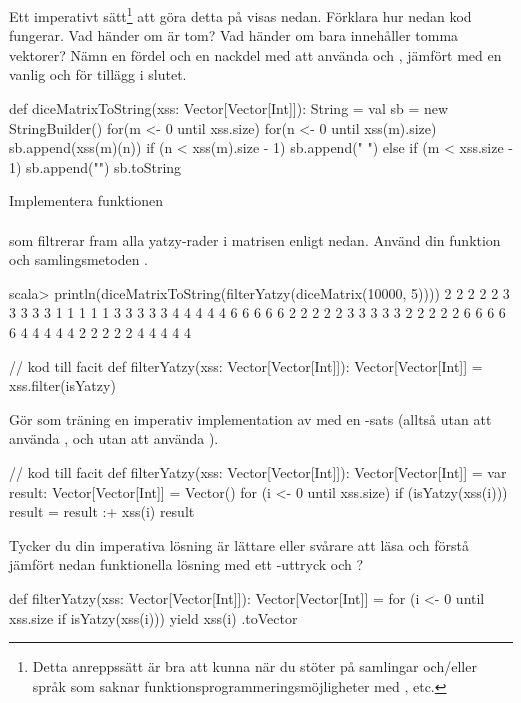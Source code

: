 \Subtask\Pen Ett imperativt sätt\footnote{Detta anreppssätt är bra att kunna när du stöter på samlingar och/eller språk som saknar funktionsprogrammeringsmöjligheter med ,  etc.} att göra detta på visas nedan. Förklara hur nedan kod fungerar. Vad händer om  är tom? Vad händer om  bara innehåller tomma vektorer? Nämn en fördel och en nackdel med att använda  och , jämfört med en vanlig  och \code{+} för tillägg i slutet.
\begin{Code}
def diceMatrixToString(xss: Vector[Vector[Int]]): String = {
  val sb = new StringBuilder()
  for(m <- 0 until xss.size) {
    for(n <- 0 until xss(m).size) { 
      sb.append(xss(m)(n))
      if (n < xss(m).size - 1) sb.append(" ") 
      else if (m < xss.size - 1) sb.append("\n")
    }
  }
  sb.toString
}
\end{Code}

\Subtask Implementera funktionen \\  \\ som filtrerar fram alla yatzy-rader i matrisen  enligt nedan. Använd din funktion  och samlingsmetoden . 
\begin{REPL}
scala> println(diceMatrixToString(filterYatzy(diceMatrix(10000, 5))))
2 2 2 2 2
3 3 3 3 3
1 1 1 1 1
3 3 3 3 3
4 4 4 4 4
6 6 6 6 6
2 2 2 2 2
3 3 3 3 3
2 2 2 2 2
6 6 6 6 6
4 4 4 4 4
2 2 2 2 2
4 4 4 4 4

\end{REPL}

\begin{Code}
// kod till facit
def filterYatzy(xss: Vector[Vector[Int]]): Vector[Vector[Int]] = 
  xss.filter(isYatzy)
\end{Code}

\Subtask Gör som träning en imperativ implementation av  med en -sats (alltså utan att använda , och utan att använda ). 
\begin{CodeSmall}
// kod till facit
def filterYatzy(xss: Vector[Vector[Int]]): Vector[Vector[Int]] = {
  var result: Vector[Vector[Int]] = Vector()
  for (i <- 0 until xss.size) {
    if (isYatzy(xss(i))) result = result :+ xss(i) 
  } 
  result
}
\end{CodeSmall}

\Subtask\Pen Tycker du din imperativa lösning är lättare eller svårare att läsa och förstå jämfört nedan funktionella lösning med ett -uttryck och ?
\begin{CodeSmall}
def filterYatzy(xss: Vector[Vector[Int]]): Vector[Vector[Int]] = {
  for (i <- 0 until xss.size if isYatzy(xss(i))) yield xss(i)
}.toVector  
\end{CodeSmall}

